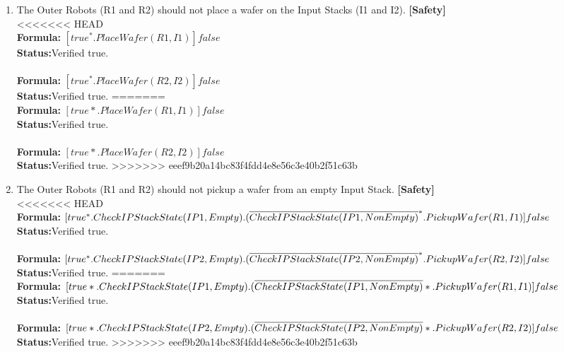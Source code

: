 \documentclass[a4paper,12pt]{article}
\begin{document}
\begin{enumerate}
		\item The Outer Robots (R1 and R2) should not place a wafer on the Input Stacks (I1 and I2). \textbf{[Safety]}
		\\
<<<<<<< HEAD
		\\\textbf{Formula:} $[true^*. PlaceWafer(R1,I1)]false $ \\\textbf{Status:}Verified true.
		\\
		\\\textbf{Formula:} $[true^*. PlaceWafer(R2,I2)]false $ \\\textbf{Status:}Verified true.
=======
		\\\textbf{Formula:} $[true*. PlaceWafer(R1,I1)]false $ \\\textbf{Status:}Verified true.
		\\
		\\\textbf{Formula:} $[true*. PlaceWafer(R2,I2)]false $ \\\textbf{Status:}Verified true.
>>>>>>> eeef9b20a14bc83f4fdd4e8e56c3e40b2f51c63b
		
		
		\item The Outer Robots (R1 and R2) should not pickup a wafer from an empty Input Stack. \textbf{[Safety]}
		\\
<<<<<<< HEAD
		\\\textbf{Formula:} $[true^*.  CheckIPStackState(IP1, Empty).
		\\(\overline{CheckIPStackState(IP1, NonEmpty)}^*.PickupWafer(R1, I1)]false$ \\\textbf{Status:}Verified true.
		\\
		\\\textbf{Formula:} $[true^*.  CheckIPStackState(IP2, Empty).
		\\(\overline{CheckIPStackState(IP2, NonEmpty)}^*.PickupWafer(R2, I2)]false$ \\\textbf{Status:}Verified true.
=======
		\\\textbf{Formula:} $[true*.  CheckIPStackState(IP1, Empty).
		\\(\overline{CheckIPStackState(IP1, NonEmpty)}*.PickupWafer(R1, I1)]false$ \\\textbf{Status:}Verified true.
		\\
		\\\textbf{Formula:} $[true*.  CheckIPStackState(IP2, Empty).
		\\(\overline{CheckIPStackState(IP2, NonEmpty)}*.PickupWafer(R2, I2)]false$ \\\textbf{Status:}Verified true.
>>>>>>> eeef9b20a14bc83f4fdd4e8e56c3e40b2f51c63b
		

\end{enumerate}
\end{document}
